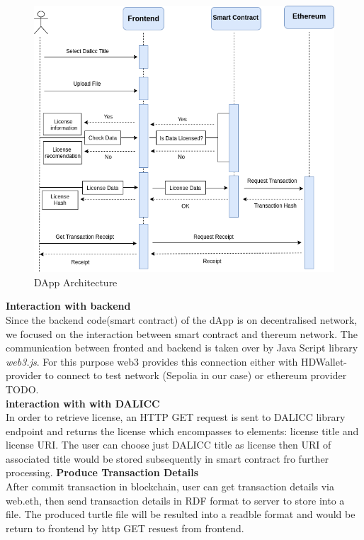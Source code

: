  \begin{center}
 	
 	\begin{figure}[htb!]
 		
 		\begin{minipage}{0.75\linewidth}
 			
 			\includegraphics[width=1.45\textwidth]{images/chap03_user_roadmap.png}
 		\end{minipage}
 		\caption{DApp Architecture}
 		
 	\end{figure}
 	
 \end{center}
 \textbf{Interaction with backend}\\
 Since the backend code(smart contract) of the dApp is on decentralised network, we focused on the interaction between smart contract and thereum network. The communication between fronted and backend is taken over by Java Script library \textit{web3.js}.
 For this purpose web3 provides this connection either with HDWallet-provider to connect to test network (Sepolia in our case) or ethereum provider TODO.\\
 \textbf{interaction with with DALICC} \\
 In order to retrieve license, an HTTP GET request is sent to DALICC library endpoint and returns the license which encompasses to elements: license title and license URI. The user can choose just DALICC title as license then URI of associated title would be stored subsequently in smart contract fro further processing. 
\textbf{Produce Transaction Details}\\
After commit transaction in blockchain, user can get transaction details via web.eth, then send transaction details in RDF format to server to store into a file. The produced turtle file will be resulted into a readble format and would be return to frontend  by http GET resuest from frontend.\\
\\
\\


